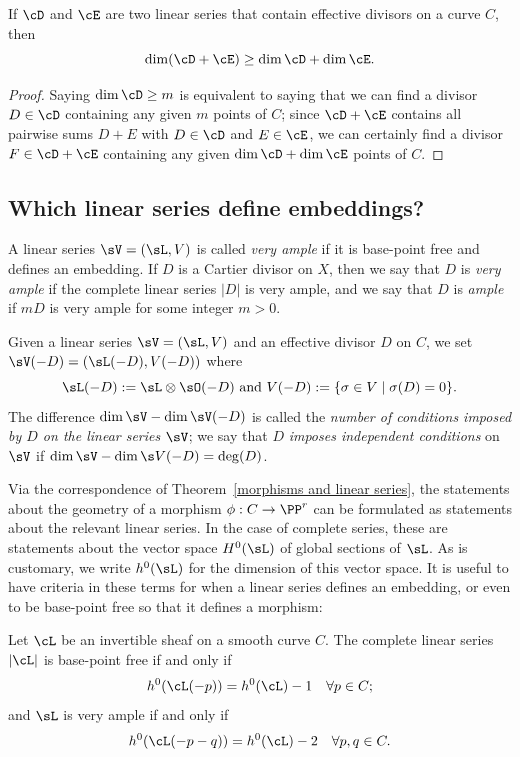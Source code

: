  
\begin{proposition}\label{sum of linear series}
 If $\cD$ and $\cE$ are two  linear series that contain effective divisors on a curve $C$, then
$$
\dim(\cD + \cE) \geq \dim \cD + \dim \cE.
$$
\end{proposition}
\begin{proof}
Saying $\dim \cD \geq m$ is equivalent to saying that we can find a divisor $D \in \cD$ containing any given $m$ points of $C$; since $\cD + \cE$ contains all pairwise sums $D + E$ with $D \in \cD$ and $E \in \cE$, we can certainly find a divisor $F \in \cD + \cE$ containing any given $\dim \cD + \dim \cE$ points of $C$.
\end{proof}

\subsection{Which linear series define embeddings?}

A linear series $\sV = (\sL, V)$ is called  \emph{very ample}  if it is base-point free and defines an embedding. If $D$ is a Cartier divisor on $X$, then we say that $D$ is \emph{very ample} if the complete linear series $|D|$ is very ample, and we say that $D$ is \emph{ample} if $mD$ is very ample for some integer $m>0$.

Given a linear series $\sV = (\sL, V)$ and an effective divisor $D$ on $C$, we  set
$
\sV(-D) = (\sL(-D),V(-D))
$
where
$$
\sL(-D): = \sL \otimes \sO(-D)\hbox{ and } V(-D) := \{ \sigma \in V \mid \sigma(D) = 0 \}.
$$
The difference $\dim \sV - \dim \sV(-D)$ is called the \emph{number of conditions imposed by $D$ on the linear series $\sV$}; we say that $D$ \emph{imposes independent conditions} on $\sV$ if $\dim \sV - \dim \s V(-D) = \deg(D)$.

Via the correspondence of Theorem~\ref{morphisms and linear series}, the statements about the geometry of a morphism $\phi : C \to \PP^r$ can be formulated as statements about the relevant linear series. In the case of complete series, these are statements about the vector space $H^{0}(\sL)$ of global sections of $\sL$. As is customary, we write $h^{0}(\sL)$ for the dimension of this vector space. It is useful to have criteria
in these terms for when a linear series defines an embedding, or even to be base-point free so that it
defines a morphism:

\begin{proposition}\label{very ample}\cite[Thm. IV.3.1]{H}
Let $\cL$ be an invertible sheaf on a smooth curve $C$. The complete linear series $|\cL|$ is base-point free if and only if
$$
h^0(\cL(-p)) = h^0(\cL) - 1 \quad \forall p \in C;
$$
and $\sL$ is very ample if and only if
$$
h^0(\cL(-p-q)) = h^0(\cL) - 2 \quad \forall p, q \in C.
$$
\end{proposition} 

